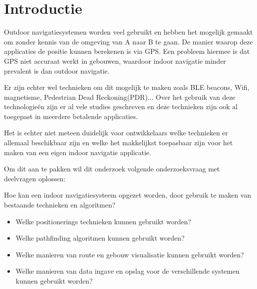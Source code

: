 \section{Introductie} %
\label{sec:introductie}
Outdoor navigatiesystemen worden veel gebruikt en hebben het mogelijk gemaakt om zonder kennis van de omgeving van A naar B te gaan. De manier waarop deze applicaties de positie kunnen berekenen is via GPS. Een probleem hiermee is dat GPS niet accuraat werkt in gebouwen, waardoor indoor navigatie minder prevalent is dan outdoor navigatie.

Er zijn echter wel technieken om dit mogelijk te maken zoals BLE beacons, Wifi, magnetisme, Pedestrian Dead Reckoning(PDR)... Over het gebruik van deze technologieën zijn er al vele studies geschreven en deze technieken zijn ook al toegepast in meerdere betalende applicaties.

Het is echter niet meteen duidelijk voor ontwikkelaars welke technieken er allemaal beschikbaar zijn en welke het makkelijkst toepasbaar zijn voor het maken van een eigen indoor navigatie applicatie.

Om dit aan te pakken wil dit onderzoek volgende onderzoeksvraag met deelvragen oplossen:

Hoe kan een indoor navigatiesysteem opgezet worden, door gebruik te maken van bestaande technieken en algoritmen?

\begin{itemize}
  \item Welke positionerings technieken kunnen gebruikt worden?
  \item Welke pathfinding algoritmen kunnen gebruikt worden?
  \item Welke manieren van route en gebouw visualisatie kunnen gebruikt worden?
  \item Welke manieren van data ingave en opslag voor de verschillende systemen kunnen gebruikt worden?
\end{itemize}


